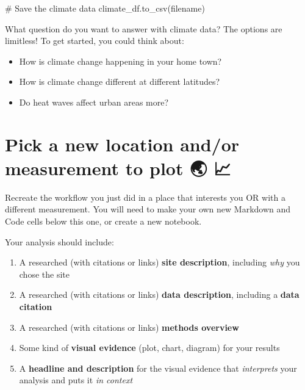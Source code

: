 \documentclass[
  letterpaper,
  DIV=11,
  numbers=noendperiod,
  oneside]{scrreprt}
\newenvironment{Shaded}{\begin{snugshade}}{\end{snugshade}}
\newcommand{\CommentTok}[1]{\textcolor[rgb]{0.37,0.37,0.37}{#1}}
\newcommand{\NormalTok}[1]{\textcolor[rgb]{0.00,0.23,0.31}{#1}}
\newcommand{\StringTok}[1]{\textcolor[rgb]{0.13,0.47,0.30}{#1}}
\providecommand{\tightlist}{%
  \setlength{\itemsep}{0pt}\setlength{\parskip}{0pt}}
\begin{document}
\begin{Shaded}
\begin{Highlighting}[]
\CommentTok{\# Save the climate data}
\NormalTok{climate\_df.to\_csv(}\StringTok{\textquotesingle{}filename\textquotesingle{}}\NormalTok{)}
\end{Highlighting}
\end{Shaded}

\begin{tcolorbox}[enhanced jigsaw, colbacktitle=quarto-callout-color!10!white, opacityback=0, bottomtitle=1mm, toptitle=1mm, bottomrule=.15mm, left=2mm, colframe=quarto-callout-color-frame, leftrule=.75mm, opacitybacktitle=0.6, colback=white, rightrule=.15mm, toprule=.15mm, breakable, titlerule=0mm, title=\textcolor{quarto-callout-color}{\faInfo}\hspace{0.5em}{Reflect and Respond}, coltitle=black, arc=.35mm]

What question do you want to answer with climate data? The options are
limitless! To get started, you could think about:

\begin{itemize}
\tightlist
\item
  How is climate change happening in your home town?
\item
  How is climate change different at different latitudes?
\item
  Do heat waves affect urban areas more?
\end{itemize}

\end{tcolorbox}

\section{Pick a new location and/or measurement to plot 🌏
📈}\label{pick-a-new-location-andor-measurement-to-plot-1}

Recreate the workflow you just did in a place that interests you OR with
a different measurement. You will need to make your own new Markdown and
Code cells below this one, or create a new notebook.

Your analysis should include:

\begin{enumerate}
\def\labelenumi{\arabic{enumi}.}
\tightlist
\item
  A researched (with citations or links) \textbf{site description},
  including \emph{why} you chose the site
\item
  A researched (with citations or links) \textbf{data description},
  including a \textbf{data citation}
\item
  A researched (with citations or links) \textbf{methods overview}
\item
  Some kind of \textbf{visual evidence} (plot, chart, diagram) for your
  results
\item
  A \textbf{headline and description} for the visual evidence that
  \emph{interprets} your analysis and puts it \emph{in context}
\end{enumerate}
\end{document}
